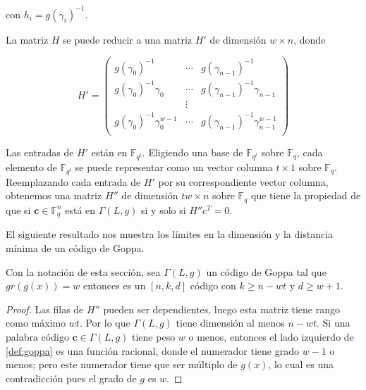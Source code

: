 con $h_i = g(\gamma_i)^{-1}$.

\begin{proposition}
    La matriz $H$ se puede reducir a una matriz $H'$ de dimensión $w \times n$, donde 

    \begin{equation}
        H' = \left(
            \begin{array}{ccc} 
                g(\gamma_0)^{-1} & \cdots & g(\gamma_{n-1})^{-1}  \\
                g(\gamma_0)^{-1} \gamma_0 & \cdots & g(\gamma_{n-1})^{-1} \gamma_{n-1} \\
                & \vdots & \\
                g(\gamma_0)^{-1} \gamma_0^{w-1} & \cdots & g(\gamma_{n-1})^{-1} \gamma_{n-1}^{w-1} \\
            \end{array}
            \right)
    \end{equation}
\end{proposition}

Las entradas de $H'$ están en $\mathbb{F}_{q^t}$. Eligiendo una base de $\mathbb{F}_{q^t}$ sobre $\mathbb{F}_q$, cada elemento de $\mathbb{F}_{q^t}$ se puede representar como un vector columna $t \times 1$ sobre $\mathbb{F}_q$. Reemplazando cada entrada de $H'$ por su correspondiente vector columna, obtenemos una matriz $H''$ de dimensión $tw \times n$ sobre $\mathbb{F}_{q}$ que tiene la propiedad de que si $\textbf{c} \in \mathbb{F}_q^n$ está en $\Gamma(L,g)$ si y solo si $H''c^T = 0$.

El siguiente resultado nos muestra los límites en la dimensión y la distancia mínima de un código de Goppa.

\begin{theorem}
    \label{th:dist_min_Goppa}
    Con la notación de esta sección, sea $\Gamma(L,g)$ un código de Goppa tal que $gr(g(x)) = w$ entonces es un $[n, k, d]$ código con $k \geq n - wt$ y $d \geq w + 1$.
\end{theorem}

\begin{proof}
    Las filas de $H''$ pueden ser dependientes, luego esta matriz tiene rango como máximo $wt$. Por lo que $\Gamma(L,g)$ tiene dimensión al menos $n - wt$. Si una palabra código $\textbf{c} \in \Gamma(L,g)$ tiene peso $w$ o menos, entonces el lado izquierdo de \ref{def:goppa} es una función racional, donde el numerador tiene grado $w - 1$ o menos; pero este numerador tiene que ser múltiplo de $g(x)$, lo cual es una contradicción pues el grado de $g$ es $w$.
\end{proof}

